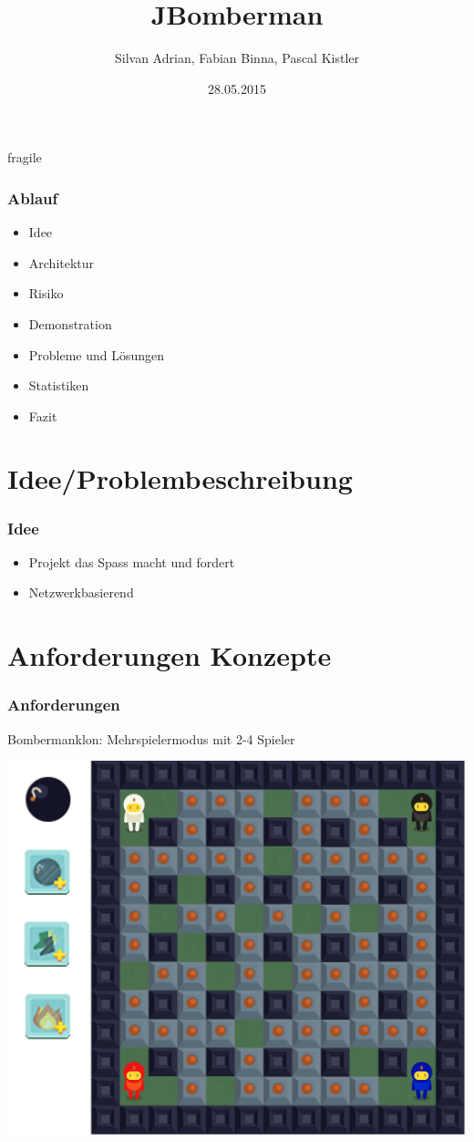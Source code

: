\documentclass[10pt, compress]{beamer}
\title{JBomberman}
\subtitle{}
\date{28.05.2015}
\author{Silvan Adrian, Fabian Binna, Pascal Kistler}
\institute{Hochschule für Technik Rapperswil}
\begin{document}
\maketitle

\begin{frame}{fragile}
	\frametitle{Ablauf}
	\begin{itemize}
	\item Idee
	\item Architektur
	\item Risiko
	\item Demonstration
	\item Probleme und Lösungen
	\item Statistiken
	\item Fazit
	\end{itemize}
\end{frame}


\section{Idee/Problembeschreibung}
\begin{frame}[fragile]
  \frametitle{Idee}
	\begin{itemize}
	\item Projekt das Spass macht und fordert
	\item Netzwerkbasierend
	\end{itemize}
\end{frame}



\section{Anforderungen  Konzepte}

\begin{frame}[fragile]
	\frametitle{Anforderungen}
	Bombermanklon: Mehrspielermodus mit 2-4 Spieler
	\begin{center}
	\includegraphics[scale=0.8]{bombermangame}
	\end{center}
\end{frame}
\end{document}
